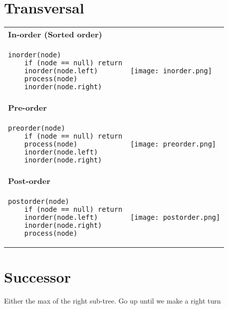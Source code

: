 \documentclass[12pt]{article}
\begin{document}
\begin{spacing}{1.5}
\section{Transversal}

\begin{tabular}{l l}
\textbf{In-order (Sorted order)} &    \\
\begin{minipage}{8cm}
\begin{verbatim}
inorder(node) 
    if (node == null) return
    inorder(node.left)
    process(node)
    inorder(node.right)
\end{verbatim}
\end{minipage}
& 
\hspace{0.4cm}
\begin{minipage}{4cm}
\texttt{[image: inorder.png]}
\end{minipage} \\  
\textbf{Pre-order} \\
\begin{minipage}{8cm}
\begin{verbatim}
preorder(node) 
    if (node == null) return
    process(node)
    inorder(node.left)
    inorder(node.right)
\end{verbatim}
\end{minipage}
& \hspace{0.4cm}
\begin{minipage}{4cm}
\texttt{[image: preorder.png]}
\end{minipage} \\
\textbf{Post-order} \\
\begin{minipage}{8cm}
\begin{verbatim}
postorder(node) 
    if (node == null) return
    inorder(node.left)
    inorder(node.right)
    process(node)
\end{verbatim}
\end{minipage}
& \hspace{0.4cm}
\begin{minipage}{4cm}
\texttt{[image: postorder.png]} 
\end{minipage}
\end{tabular}

\section{Successor}

Either the max of the right sub-tree. Go up until we make a right turn


\end{spacing}
\end{document}
